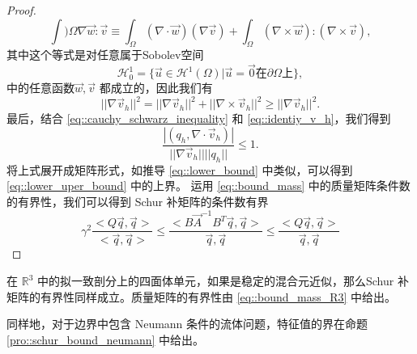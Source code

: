 \begin{proof}
            \begin{equation}
                \int){\Omega} \nabla \vec{w} : \vec{v} \equiv \int_{\Omega} (\nabla \cdot \vec{w})(\nabla \vec{v}) + \int_{\Omega} (\nabla \times \vec{w}) : (\nabla \times \vec{v}),
            \end{equation}
            其中这个等式是对任意属于Sobolev空间
            \begin{equation}
                \mathcal{H}_0^1 = \{ \vec{u} \in \mathcal{H}^1(\Omega) | \vec{u} = \vec{0} \mbox{在} \partial \Omega \mbox{上} \},
            \end{equation}
            中的任意函数$\vec{w}, \vec{v}$ 都成立的，因此我们有
            \begin{equation}
                ||\nabla \vec{v}_h||^2 = ||\nabla \vec{v}_h||^2 + ||\nabla \times \vec{v}_h||^2 \geq ||\nabla \vec{v}_h||^2.
                \label{eq::identiy_v_h}
            \end{equation}
            最后，结合 \eqref{eq::cauchy_schwarz_inequality} 和 \eqref{eq::identiy_v_h}，我们得到
            \begin{equation}
                \frac{|(q_h, \nabla \cdot \vec{v}_h)|}{||\nabla \vec{v}_h|| ||q_h||} \leq 1.
            \end{equation}
            将上式展开成矩阵形式，如推导 \eqref{eq::lower_bound} 中类似，可以得到 \eqref{eq::lower_uper_bound} 中的上界。
            运用 \eqref{eq::bound_mass} 中的质量矩阵条件数的有界性，我们可以得到 Schur 补矩阵的条件数有界
            \begin{equation}
                \gamma^2 \frac{<Q\vec{q}, \vec{q}>}{<\vec{q}, \vec{q}>} \leq \frac{<B \vec{A}^{-1}B^T \vec{q}, \vec{q}>}{\vec{q}, \vec{q}} \leq \frac{<Q \vec{q}, \vec{q}>}{\vec{q}, \vec{q}}
            \end{equation}
        \end{proof}

        \begin{remark}
            在 $\mathbb{R}^3$ 中的拟一致剖分上的四面体单元，如果是稳定的混合元近似，那么Schur
            补矩阵的有界性同样成立。质量矩阵的有界性由 \ref{eq::bound_mass_R3} 中给出。
        \end{remark}

        同样地，对于边界中包含 Neumann 条件的流体问题，特征值的界在命题 \ref{pro::schur_bound_neumann} 中给出。

